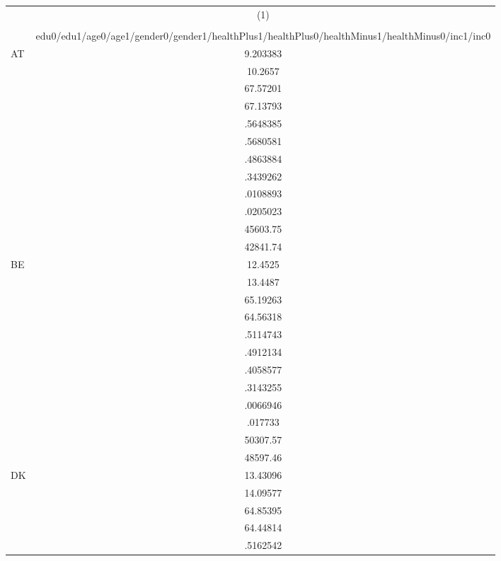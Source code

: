 {
\def\sym#1{\ifmmode^{#1}\else\(^{#1}\)\fi}
\begin{tabular}{l*{1}{c}}
\hline\hline
                    &\multicolumn{1}{c}{(1)}\\
                    &\multicolumn{1}{c}{}\\
                    &edu0/edu1/age0/age1/gender0/gender1/healthPlus1/healthPlus0/healthMinus1/healthMinus0/inc1/inc0\\
\hline
AT                  &    9.203383\\
                    &     10.2657\\
                    &    67.57201\\
                    &    67.13793\\
                    &    .5648385\\
                    &    .5680581\\
                    &    .4863884\\
                    &    .3439262\\
                    &    .0108893\\
                    &    .0205023\\
                    &    45603.75\\
                    &    42841.74\\
BE                  &     12.4525\\
                    &     13.4487\\
                    &    65.19263\\
                    &    64.56318\\
                    &    .5114743\\
                    &    .4912134\\
                    &    .4058577\\
                    &    .3143255\\
                    &    .0066946\\
                    &     .017733\\
                    &    50307.57\\
                    &    48597.46\\
DK                  &    13.43096\\
                    &    14.09577\\
                    &    64.85395\\
                    &    64.44814\\
                    &    .5162542\\

\end{tabular}}
